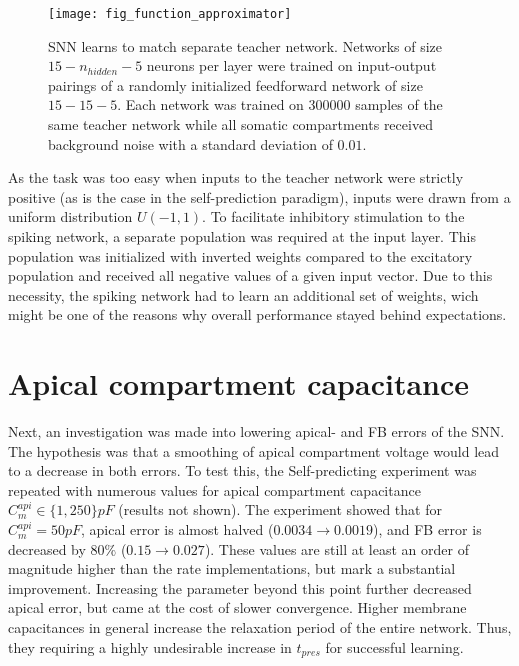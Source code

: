 \begin{figure}[h]
    \centering
    \texttt{[image: fig\_function\_approximator]}
    \caption[SNN learns to match separate teacher network]{SNN learns to match separate teacher network. Networks of
    size $15-n_{hidden}-5$ neurons per layer were trained on input-output pairings of a randomly initialized feedforward
    network of size $15-15-5$. Each network was trained on 300000 samples of the same teacher network while all somatic
    compartments received background noise with a standard deviation of $0.01$.}
    \label{fig-func-approx}
\end{figure}

As the task was too easy when inputs to the teacher network were strictly positive (as is the case in the
self-prediction paradigm), inputs were drawn from a uniform distribution $U(-1,1)$. To facilitate inhibitory stimulation
to the spiking network, a separate population was required at the input layer. This population was initialized with
inverted weights compared to the excitatory population and received all negative values of a given input vector. Due to
this necessity, the spiking network had to learn an additional set of weights, wich might be one of the reasons why
overall performance stayed behind expectations.


\section{Apical compartment capacitance}\label{sec-c-m-api}

Next, an investigation was made into lowering apical- and FB errors of the SNN. The hypothesis was that a smoothing of
apical compartment voltage would lead to a decrease in both errors. To test this, the Self-predicting experiment was
repeated with numerous values for apical compartment capacitance $C_m^{api} \in \{ 1, 250 \} pF$ (results not shown).
The experiment showed that for $C_m^{api} = 50pF$, apical error is almost halved ($0.0034 \rightarrow 0.0019$), and FB
error is decreased by $80\%$ ($0.15 \rightarrow 0.027$). These values are still at least an order of magnitude higher
than the rate implementations, but mark a substantial improvement. Increasing the parameter beyond this point further
decreased apical error, but came at the cost of slower convergence. Higher membrane capacitances in general increase the
relaxation period of the entire network. Thus, they requiring a highly undesirable increase in $t_{pres}$ for successful
learning.

